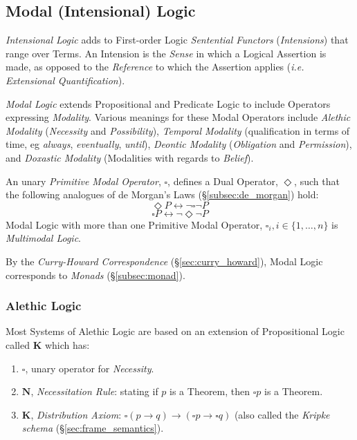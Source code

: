\documentclass{article}
\begin{document}
\subsection{Modal (Intensional) Logic} \label{subsec:modal_logic}

\emph{Intensional Logic} adds to First-order Logic \emph{Sentential
  Functors} (\emph{Intensions}) that range over Terms. An Intension is
the \emph{Sense} in which a Logical Assertion is made, as opposed to
the \emph{Reference} to which the Assertion applies (\emph{i.e.
  Extensional Quantification}).

\emph{Modal Logic} extends Propositional and Predicate Logic to
include Operators expressing \emph{Modality}. Various meanings for
these Modal Operators include \emph{Alethic Modality}
(\emph{Necessity} and \emph{Possibility}), \emph{Temporal Modality}
(qualification in terms of time, eg \emph{always}, \emph{eventually},
\emph{until}), \emph{Deontic Modality} (\emph{Obligation} and
\emph{Permission}), and \emph{Doxastic Modality} (Modalities with
regards to \emph{Belief}).

An unary \emph{Primitive Modal Operator}, $\square$, defines a Dual
Operator, $\Diamond$, such that the following analogues of de Morgan's
Laws (\S\ref{subsec:de_morgan}) hold:
    \[\Diamond P \leftrightarrow \neg \square \neg P\]
    \[\square P \leftrightarrow \neg \Diamond \neg P\]
Modal Logic with more than one Primitive Modal Operator, $\square _i,
i \in \{1, \ldots, n\}$ is \emph{Multimodal Logic}.

By the \emph{Curry-Howard Correspondence}
(\S\ref{sec:curry_howard}), Modal Logic corresponds
to \emph{Monads} (\S\ref{subsec:monad}).

\subsubsection{Alethic Logic}\label{subsec:alethic_logic}

Most Systems of Alethic Logic are based on an extension of
Propositional Logic called $\mathbf{K}$ which has:

\begin{enumerate}
\item $\square$, unary operator for \emph{Necessity}.
\item $\mathbf{N}$, \emph{Necessitation Rule}: stating if $p$ is a
  Theorem, then $\square p$ is a Theorem.
\item $\mathbf{K}$, \emph{Distribution Axiom}: $\square(p \rightarrow
  q) \rightarrow (\square p \rightarrow \square q)$ (also called the
  \emph{Kripke schema} (\S\ref{sec:frame_semantics}).
\end{enumerate}
\end{document}
